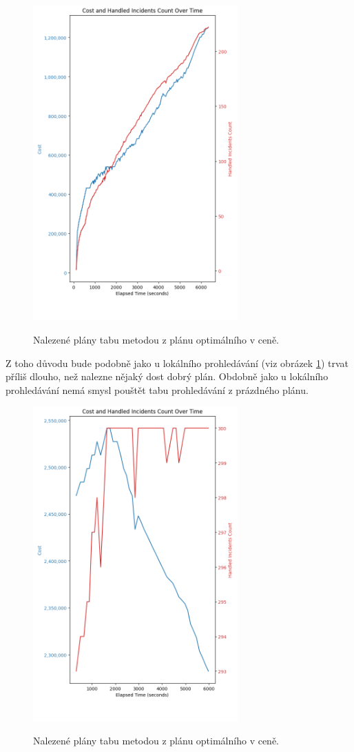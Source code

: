\begin{figure}[H]
  \caption{Nalezené plány tabu metodou z plánu optimálního v ceně.}
  \includegraphics[width=0.7\textwidth,height=0.9\textwidth]{img/plots/tabuSearch_empty.png}
  \centering
  \label{img:empty_tabu}
\end{figure}

Z toho důvodu bude podobně jako u lokálního prohledávání (viz obrázek \ref{img:empty_tabu}) trvat příliš dlouho, než nalezne nějaký dost dobrý plán.
Obdobně jako u lokálního prohledávání nemá smysl pouštět tabu prohledávání z prázdného plánu.

\begin{figure}[H]
  \caption{Nalezené plány tabu metodou z plánu optimálního v ceně.}
  \includegraphics[width=0.7\textwidth,height=0.9\textwidth]{img/plots/tabuSearch_fromOptimal.png}
  \centering
  \label{img:hybrid_tabu}
\end{figure}

